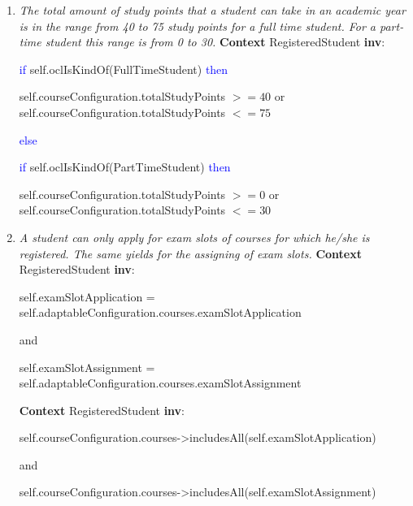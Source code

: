 \begin{enumerate}
	\item \emph{The total amount of study points that a student can take in an
	academic year is in the range from 40 to 75 study points for a full time
	student. For a part-time student this range is from 0 to 30.}
	\npar \textbf{Context} RegisteredStudent \textbf{inv}:
	\par \hspace*{5 mm} \textcolor{Blue}{if} self.oclIsKindOf(FullTimeStudent)
	\textcolor{Blue}{then}
	\par \hspace*{10 mm} self.courseConfiguration.totalStudyPoints $>= 40$ or
	self.courseConfiguration.totalStudyPoints $<= 75$
	\par \hspace*{5 mm} \textcolor{Blue}{else}
	\par \hspace*{10 mm} \textcolor{Blue}{if} self.oclIsKindOf(PartTimeStudent)
	\textcolor{Blue}{then}
	\par \hspace*{10 mm} self.courseConfiguration.totalStudyPoints $>= 0$ or
	self.courseConfiguration.totalStudyPoints $<= 30$
	
	\item \emph{A student can only apply for exam slots of
	courses for which he/she is registered. The same yields for the assigning of
	exam slots.}
	\npar \textbf{Context} RegisteredStudent \textbf{inv}:
	\par \hspace*{5 mm} self.examSlotApplication =
	self.adaptableConfiguration.courses.examSlotApplication
	\par \hspace*{5 mm} and
	\par \hspace*{5 mm} self.examSlotAssignment =
	self.adaptableConfiguration.courses.examSlotAssignment
	
	\npar \textbf{Context} RegisteredStudent \textbf{inv}:
	\par \hspace*{5 mm} self.courseConfiguration.courses->includesAll(self.examSlotApplication)
	\par \hspace*{5 mm} and
	\par \hspace*{5 mm} self.courseConfiguration.courses->includesAll(self.examSlotAssignment)
	

\end{enumerate}
